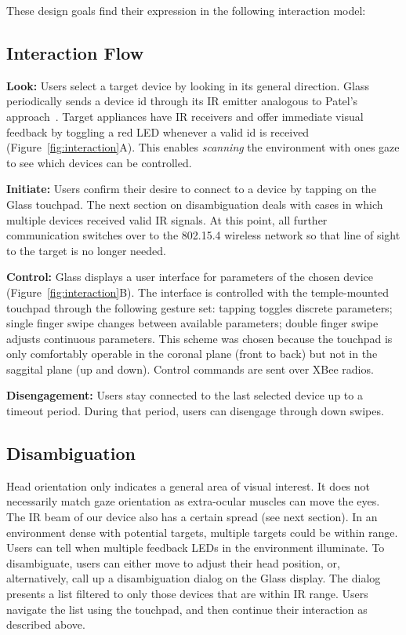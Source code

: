 These design goals find their expression in the following interaction model:

\subsection{Interaction Flow}
{\bf Look:} Users select a target device by looking in its general direction.
Glass periodically sends a device id through its IR emitter analogous to Patel's approach~\cite{patel_2-way_2003}. Target appliances have IR receivers and offer immediate visual feedback by toggling a red LED whenever a valid id is received (Figure~\ref{fig:interaction}A). This enables {\em scanning} the environment with ones gaze to see which devices can be controlled.

{\bf Initiate:} Users confirm their desire to connect to a device by tapping on the Glass touchpad. The next section on disambiguation deals with cases in which multiple devices received valid IR signals. At this point, all further communication switches over to the 802.15.4 wireless network so that line of sight to the target is no longer needed.

{\bf Control:} Glass displays a user interface for parameters of the chosen device (Figure~\ref{fig:interaction}B). The interface is controlled with the temple-mounted touchpad through the following gesture set: tapping toggles discrete parameters; single finger swipe changes between available parameters; double finger swipe adjusts continuous parameters. This scheme was chosen because the touchpad is only comfortably operable in the coronal plane (front to back) but not in the saggital plane (up and down). 
Control commands are sent over XBee radios.

{\bf Disengagement:} Users stay connected to the last selected device up to a timeout period. During that period, users can disengage through down swipes.

\subsection{Disambiguation}
Head orientation only indicates a general area of visual interest. It does not necessarily match gaze orientation as extra-ocular muscles can move the eyes. The IR beam of our device also has a certain spread (see next section). In an environment dense with potential targets, multiple targets could be within range. Users can tell when multiple feedback LEDs in the environment illuminate. To disambiguate, users can either move to adjust their head position, or, alternatively, call up a disambiguation dialog on the Glass display. The dialog presents a list filtered to only those devices that are within IR range. Users navigate the list using the touchpad, and then continue their interaction as described above.

